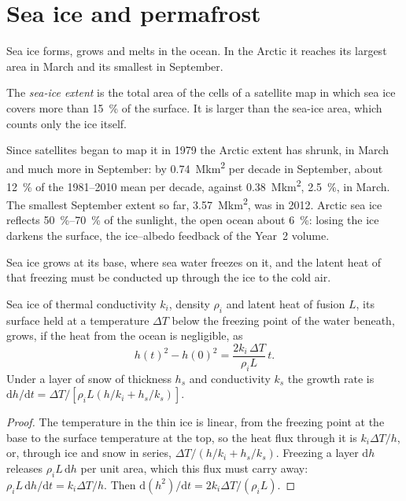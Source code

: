 \section{Sea ice and permafrost}\label{sec:b3:glaciology:sea-ice}

Sea ice forms, grows and melts in the ocean. In the Arctic it reaches its
largest area in March and its smallest in September.

\begin{definition}\label{def:b3:glaciology:sea-ice}
The \emph{sea-ice extent} is the total area of the
cells of a satellite map in which sea ice covers more than
\qty{15}{\percent} of the surface. It is larger than the sea-ice area,
which counts only the ice itself.
\end{definition}

Since satellites began to map it in 1979 the Arctic extent has shrunk, in
March and much more in September: by \qty{0.74}{\mega km^2} per decade in
September, about \qty{12}{\percent} of the 1981--2010 mean per decade, against
\qty{0.38}{\mega km^2}, \qty{2.5}{\percent}, in March. The smallest
September extent so far, \qty{3.57}{\mega km^2}, was in 2012. Arctic sea
ice reflects \qtyrange{50}{70}{\percent} of the sunlight, the open ocean
about \qty{6}{\percent}: losing the ice darkens the surface, the ice--albedo
feedback of the Year~2 volume.

Sea ice grows at its base, where sea water freezes on it, and the latent
heat of that freezing must be conducted up through the ice to the cold air.

\begin{theorem}\label{thm:b3:glaciology:stefan}
Sea ice of thermal conductivity $k_i$, density $\rho_i$ and latent heat of
fusion $L$, its surface held at a temperature $\Delta T$ below the freezing
point of the water beneath, grows, if the heat from the ocean is
negligible, as
\[
h(t)^2 - h(0)^2 = \frac{2k_i\,\Delta T}{\rho_iL}\,t .
\]
Under a layer of snow of thickness $h_s$ and conductivity $k_s$ the growth
rate is $\mathrm dh/\mathrm dt = \Delta T/[\rho_iL(h/k_i + h_s/k_s)]$.
\end{theorem}

\begin{proof}
The temperature in the thin ice is linear, from the freezing point at the
base to the surface temperature at the top, so the heat flux through it is
$k_i\Delta T/h$, or, through ice and snow in series, $\Delta T/(h/k_i +
h_s/k_s)$. Freezing a layer $\mathrm dh$ releases $\rho_iL\,\mathrm dh$ per
unit area, which this flux must carry away: $\rho_iL\,\mathrm dh/\mathrm dt
= k_i\Delta T/h$. Then $\mathrm d(h^2)/\mathrm dt = 2k_i\Delta T/(\rho_iL)$.
\end{proof}

